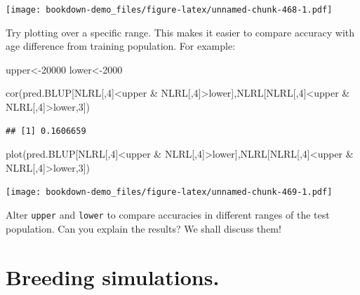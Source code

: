 \documentclass[
]{book}
\newenvironment{Shaded}{\begin{snugshade}}{\end{snugshade}}
\newcommand{\DecValTok}[1]{\textcolor[rgb]{0.00,0.00,0.81}{#1}}
\newcommand{\FunctionTok}[1]{\textcolor[rgb]{0.00,0.00,0.00}{#1}}
\newcommand{\NormalTok}[1]{#1}
\newcommand{\OtherTok}[1]{\textcolor[rgb]{0.56,0.35,0.01}{#1}}
\newcommand{\SpecialCharTok}[1]{\textcolor[rgb]{0.00,0.00,0.00}{#1}}
\begin{document}
\texttt{[image: bookdown-demo\_files/figure-latex/unnamed-chunk-468-1.pdf]}

Try plotting over a specific range. This makes it easier to compare accuracy with age
difference from training population. For example:

\begin{Shaded}
\begin{Highlighting}[]
\NormalTok{upper}\OtherTok{\textless{}{-}}\DecValTok{20000}
\NormalTok{lower}\OtherTok{\textless{}{-}}\DecValTok{2000}

\FunctionTok{cor}\NormalTok{(pred.BLUP[NLRL[,}\DecValTok{4}\NormalTok{]}\SpecialCharTok{\textless{}}\NormalTok{upper }\SpecialCharTok{\&}\NormalTok{ NLRL[,}\DecValTok{4}\NormalTok{]}\SpecialCharTok{\textgreater{}}\NormalTok{lower],NLRL[NLRL[,}\DecValTok{4}\NormalTok{]}\SpecialCharTok{\textless{}}\NormalTok{upper }\SpecialCharTok{\&}
\NormalTok{NLRL[,}\DecValTok{4}\NormalTok{]}\SpecialCharTok{\textgreater{}}\NormalTok{lower,}\DecValTok{3}\NormalTok{])}
\end{Highlighting}
\end{Shaded}

\begin{verbatim}
## [1] 0.1606659
\end{verbatim}

\begin{Shaded}
\begin{Highlighting}[]
\FunctionTok{plot}\NormalTok{(pred.BLUP[NLRL[,}\DecValTok{4}\NormalTok{]}\SpecialCharTok{\textless{}}\NormalTok{upper }\SpecialCharTok{\&}\NormalTok{ NLRL[,}\DecValTok{4}\NormalTok{]}\SpecialCharTok{\textgreater{}}\NormalTok{lower],NLRL[NLRL[,}\DecValTok{4}\NormalTok{]}\SpecialCharTok{\textless{}}\NormalTok{upper }\SpecialCharTok{\&}
\NormalTok{NLRL[,}\DecValTok{4}\NormalTok{]}\SpecialCharTok{\textgreater{}}\NormalTok{lower,}\DecValTok{3}\NormalTok{])}
\end{Highlighting}
\end{Shaded}

\texttt{[image: bookdown-demo\_files/figure-latex/unnamed-chunk-469-1.pdf]}

Alter \texttt{upper} and \texttt{lower} to compare accuracies in different ranges of the test population.
Can you explain the results? We shall discuss them!

\hypertarget{Breeding-simulations}{%
\chapter{Breeding simulations.}\label{Breeding-simulations}}

\backmatter

  

\printindex
\end{document}
